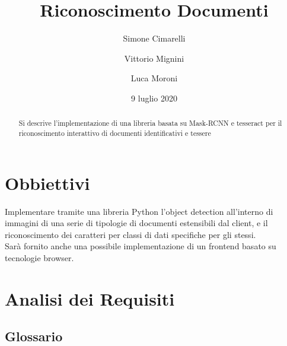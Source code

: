\documentclass[12pt,a4paper]{article}
\begin{document}
\title{Riconoscimento Documenti}
\author{Simone Cimarelli \and Vittorio Mignini \and Luca Moroni}
\date{9 luglio 2020}

\maketitle

\begin{abstract}
    Si descrive l'implementazione di una libreria basata su Mask-RCNN e
    tesseract per il riconoscimento interattivo di documenti
    identificativi e tessere
\end{abstract}

\section{Obbiettivi}

Implementare tramite una libreria Python l'object detection all'interno
di immagini di una serie di tipologie di documenti estensibili dal
client, e il riconoscimento dei caratteri per classi di dati specifiche
per gli stessi.\\
Sarà fornito anche una possibile implementazione di un frontend basato
su tecnologie browser.

\section{Analisi dei Requisiti}
\subsection{Glossario}
\end{document}
